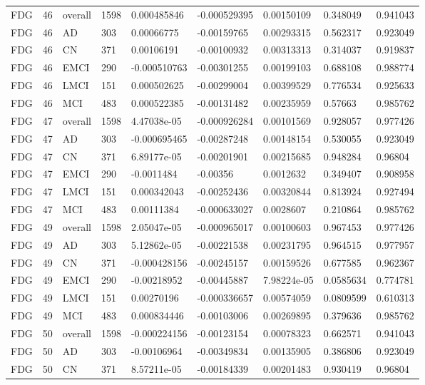 \begin{landscape}
\begin{longtable}{lllllllll}
FDG & 46 & overall & 1598 & 0.000485846 & -0.000529395 & 0.00150109 & 0.348049 & 0.941043 \\
FDG & 46 & AD & 303 & 0.00066775 & -0.00159765 & 0.00293315 & 0.562317 & 0.923049 \\
FDG & 46 & CN & 371 & 0.00106191 & -0.00100932 & 0.00313313 & 0.314037 & 0.919837 \\
FDG & 46 & EMCI & 290 & -0.000510763 & -0.00301255 & 0.00199103 & 0.688108 & 0.988774 \\
FDG & 46 & LMCI & 151 & 0.000502625 & -0.00299004 & 0.00399529 & 0.776534 & 0.925633 \\
FDG & 46 & MCI & 483 & 0.000522385 & -0.00131482 & 0.00235959 & 0.57663 & 0.985762 \\
FDG & 47 & overall & 1598 & 4.47038e-05 & -0.000926284 & 0.00101569 & 0.928057 & 0.977426 \\
FDG & 47 & AD & 303 & -0.000695465 & -0.00287248 & 0.00148154 & 0.530055 & 0.923049 \\
FDG & 47 & CN & 371 & 6.89177e-05 & -0.00201901 & 0.00215685 & 0.948284 & 0.96804 \\
FDG & 47 & EMCI & 290 & -0.0011484 & -0.00356 & 0.0012632 & 0.349407 & 0.908958 \\
FDG & 47 & LMCI & 151 & 0.000342043 & -0.00252436 & 0.00320844 & 0.813924 & 0.927494 \\
FDG & 47 & MCI & 483 & 0.00111384 & -0.000633027 & 0.0028607 & 0.210864 & 0.985762 \\
FDG & 49 & overall & 1598 & 2.05047e-05 & -0.000965017 & 0.00100603 & 0.967453 & 0.977426 \\
FDG & 49 & AD & 303 & 5.12862e-05 & -0.00221538 & 0.00231795 & 0.964515 & 0.977957 \\
FDG & 49 & CN & 371 & -0.000428156 & -0.00245157 & 0.00159526 & 0.677585 & 0.962367 \\
FDG & 49 & EMCI & 290 & -0.00218952 & -0.00445887 & 7.98224e-05 & 0.0585634 & 0.774781 \\
FDG & 49 & LMCI & 151 & 0.00270196 & -0.000336657 & 0.00574059 & 0.0809599 & 0.610313 \\
FDG & 49 & MCI & 483 & 0.000834446 & -0.00103006 & 0.00269895 & 0.379636 & 0.985762 \\
FDG & 50 & overall & 1598 & -0.000224156 & -0.00123154 & 0.00078323 & 0.662571 & 0.941043 \\
FDG & 50 & AD & 303 & -0.00106964 & -0.00349834 & 0.00135905 & 0.386806 & 0.923049 \\
FDG & 50 & CN & 371 & 8.57211e-05 & -0.00184339 & 0.00201483 & 0.930419 & 0.96804 \\

\end{longtable}
\end{landscape}
